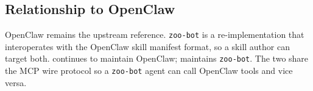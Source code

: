 \subsection{Relationship to OpenClaw}

OpenClaw remains the upstream reference. \texttt{zoo-bot} is a
re-implementation that interoperates with the OpenClaw skill manifest
format, so a skill author can target both. \Hanzo{} continues to
maintain OpenClaw; \Zoo{} maintains \texttt{zoo-bot}. The two share
the MCP wire protocol so a \texttt{zoo-bot} agent can call OpenClaw
tools and vice versa.
